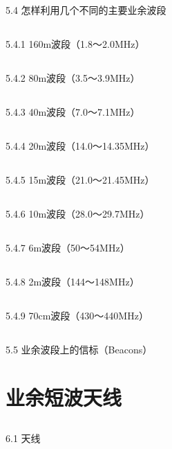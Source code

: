 \documentclass[12pt,UTF8]{ctexbook}
\begin{document}
\section{}5.4 怎样利用几个不同的主要业余波段
\section{}5.4.1 160m波段（1.8～2.0MHz）
\section{}5.4.2 80m波段（3.5～3.9MHz）
\section{}5.4.3 40m波段（7.0～7.1MHz）
\section{}5.4.4 20m波段（14.0～14.35MHz）
\section{}5.4.5 15m波段（21.0～21.45MHz）
\section{}5.4.6 10m波段（28.0～29.7MHz）
\section{}5.4.7 6m波段（50～54MHz）
\section{}5.4.8 2m波段（144～148MHz）
\section{}5.4.9 70cm波段（430～440MHz）
\section{}5.5 业余波段上的信标（Beacons）

\chapter{业余短波天线}

\section{}6.1 天线
\end{document}
